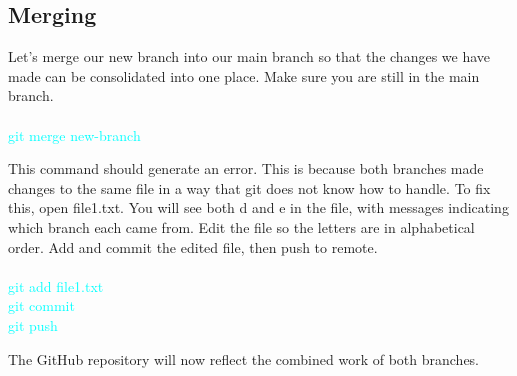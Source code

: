 \documentclass[10pt,twocolumn]{article}
\begin{document}
\subsection{Merging }

Let’s merge our new branch into our main branch so that the changes we have made can be consolidated into one place. Make sure you are still in the main branch.\\\\
\textcolor{cyan}{
git merge new-branch\\
}

This command should generate an error. This is because both branches made changes to the same file in a way that git does not know how to handle. To fix this, open file1.txt. You will see both d and e in the file, with messages indicating which branch each came from. Edit the file so the letters are in alphabetical order. Add and commit the edited file, then push to remote. \\\\
\textcolor{cyan}{
git add file1.txt\\
git commit\\
git push\\
}

The GitHub repository will now reflect the combined work of both branches. 
\end{document}
